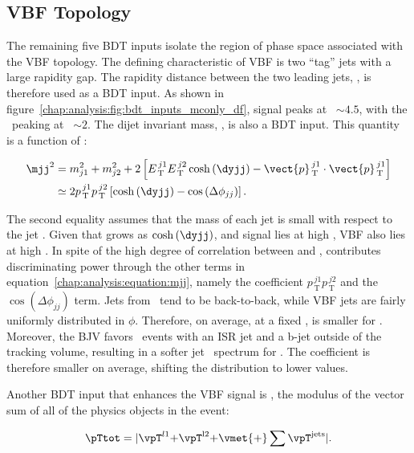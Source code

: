 \subsection{VBF Topology}

The remaining five BDT inputs isolate the region of phase space associated with
the VBF topology. The defining characteristic of VBF is two ``tag''
jets with a large rapidity gap. The rapidity distance between the two
leading jets, \dyjj, is therefore used as a BDT input. As shown in
figure~\ref{chap:analysis:fig:bdt_inputs_mconly_df}, signal peaks at \dyjj~$\sim 4.5$, with
the \ttbar~peaking at \dyjj~$\sim 2$. The dijet invariant mass, \mjj, is also
a BDT input. This quantity is a function of \dyjj:

\begin{equation}
\begin{aligned}
\label{chap:analysis:equation:mjj}
\mjj^2 & = m_{j1}^2 + m_{j2}^2 + 2\left [E_{\,\mathrm{T}}^{\,j1}E_{\,\mathrm{T}}^{\,j2}\cosh{(\dyjj)}
- \vect{p}_{\,\mathrm{T}}^{\,j1}\cdot\vect{p}_{\,\mathrm{T}}^{\,j1}\right ] \\
& \simeq 2p_{\,\mathrm{T}}^{\,j1}p_{\,\mathrm{T}}^{\,j2}\left
[\cosh{(\dyjj)}-\cos{(\Delta{\phi}_{jj})}\right ].
\end{aligned}
\end{equation}

\noindent
The second equality assumes that the mass of each jet is small with
respect to the jet \pt. Given that \mjj grows as $\cosh{(\dyjj)}$, and
signal lies at high \dyjj, VBF also lies at high \mjj. In spite of the
high degree of correlation between \dyjj and \mjj, \mjj contributes
discriminating power through the other terms in
equation~\ref{chap:analysis:equation:mjj}, namely the coefficient
$p_{\,\mathrm{T}}^{\,j1}p_{\,\mathrm{T}}^{\,j2}$ and the
$\cos{(\Delta{\phi}_{jj})}$ term. Jets from \ttbar~tend to be
back-to-back, while VBF jets are fairly uniformly distributed in
$\phi$. Therefore, on average, at a fixed \mjj, \dyjj is smaller
for \ttbar. Moreover, the BJV favors \ttbar~events with an ISR jet and
a b-jet outside of the tracking volume, resulting in a softer
jet \pt~spectrum for \ttbar. The coefficient is therefore smaller on
average, shifting the \mjj distribution to lower values. 

Another BDT input that enhances the VBF signal is \pTtot, the modulus
of the vector sum of all of the physics objects in the event:

\begin{equation}
\begin{aligned}
\label{chap:analysis:equation:pttot}
\pTtot = |\vpT^{l1}{+}\vpT^{\rm l2}{+}\vmet{+}\sum\vpT^{\rm
jets}|.
\end{aligned}
\end{equation}


